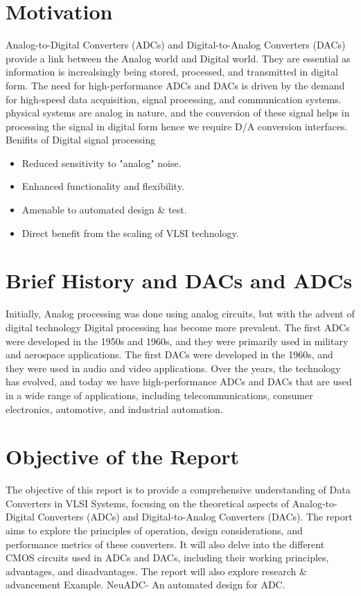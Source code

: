 \section{Motivation}
Analog-to-Digital Converters (ADCs) and Digital-to-Analog Converters (DACs) provide a link between the Analog world and Digital world. They are essential as information is increalsingly being stored, processed, and transmitted in digital form. The need for high-performance ADCs and DACs is driven by the demand for high-speed data acquisition, signal processing, and communication systems.
physical systems are analog in nature, and the conversion of these signal helps in processing the signal in digital form hence we require D/A conversion interfaces.
Benifits of Digital signal processing
\begin{itemize}
    \item Reduced sensitivity to "analog" noise.
    \item Enhanced functionality and flexibility.
    \item Amenable to automated design \& test.
    \item Direct benefit from the scaling of VLSI technology.
\end{itemize}
\section{Brief History and DACs and ADCs}
Initially, Analog processing was done using analog circuits, but with the advent of digital technology Digital processing has become more prevalent. The first ADCs were developed in the 1950s and 1960s, and they were primarily used in military and aerospace applications. The first DACs were developed in the 1960s, and they were used in audio and video applications. Over the years, the technology has evolved, and today we have high-performance ADCs and DACs that are used in a wide range of applications, including telecommunications, consumer electronics, automotive, and industrial automation.

\section{Objective of the Report}
The objective of this report is to provide a comprehensive understanding of Data Converters in VLSI Systems, focusing on the theoretical aspects of Analog-to-Digital Converters (ADCs) and Digital-to-Analog Converters (DACs). The report aims to explore the principles of operation, design considerations, and performance metrics of these converters. It will also delve into the different CMOS circuits used in ADCs and DACs, including their working principles, advantages, and disadvantages. The report will
also explore research \& advancement Example. NeuADC- An automated design for ADC.


